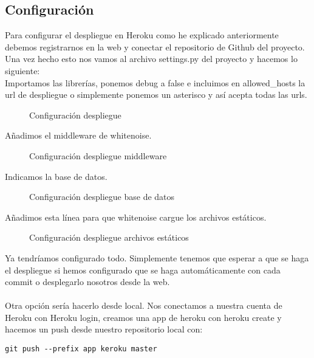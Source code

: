 \subsection{Configuración}

Para configurar el despliegue en Heroku como he explicado anteriormente debemos registrarnos en la web y conectar el repositorio de Github del proyecto.
Una vez hecho esto nos vamos al archivo settings.py del proyecto y hacemos lo siguiente:\\
Importamos las librerías, ponemos debug a false e incluimos en allowed\_hosts la url de despliegue o simplemente ponemos un asterisco y así acepta todas las urls.

\begin{figure}[H]
  \centering
  \noindent{}
  \caption{Configuración despliegue}
\end{figure}

Añadimos el middleware de whitenoise.

\begin{figure}[H]
  \centering
  \noindent{}
  \caption{Configuración despliegue middleware}
\end{figure}

Indicamos la base de datos.

\begin{figure}[H]
  \centering
  \noindent{}
  \caption{Configuración despliegue base de datos}
\end{figure}

Añadimos esta línea para que whitenoise cargue los archivos estáticos.

\begin{figure}[H]
  \centering
  \noindent{}
  \caption{Configuración despliegue archivos estáticos}
\end{figure}

Ya tendríamos configurado todo. Simplemente tenemos que esperar a que se haga el despliegue si hemos configurado que se haga automáticamente con cada commit o desplegarlo nosotros desde la web.\\\\

Otra opción sería hacerlo desde local.
Nos conectamos a nuestra cuenta de Heroku con Heroku login, creamos una app de heroku con heroku create y hacemos un push desde nuestro repositorio local con:
\begin{lstlisting}
git push --prefix app keroku master
\end{lstlisting}


